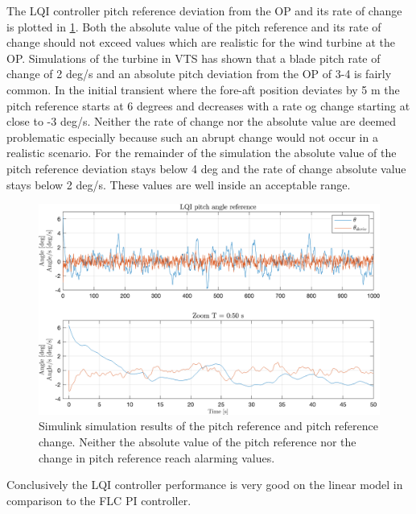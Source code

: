 The LQI controller pitch reference deviation from the OP and its rate of change is plotted in \cref{fig:app_sim_10_pitch}. Both the absolute value of the pitch reference and its rate of change should not exceed values which are realistic for the wind turbine at the OP. Simulations of the turbine in VTS has shown that a blade pitch rate of change of 2 deg/s and an absolute pitch deviation from the OP of 3-4 is fairly common. In the initial transient where the fore-aft position deviates by 5 m the pitch reference starts at 6 degrees and decreases with a rate og change starting at close to -3 deg/s. Neither the rate of change nor the absolute value are deemed problematic especially because such an abrupt change would not occur in a realistic scenario. For the remainder of the simulation the absolute value of the pitch reference deviation stays below 4 deg and the rate of change absolute value stays below 2 deg/s. These values are well inside an acceptable range.
\begin{figure}[ht]
	\centering
	\includegraphics[width=0.7\linewidth]{Graphics/TestResults/linearModPerf/sim_10_pitch.png}
	\caption{Simulink simulation results of the pitch reference and pitch reference change. Neither the absolute value of the pitch reference nor the change in pitch reference reach alarming values.}
	\label{fig:app_sim_10_pitch}
\end{figure}

Conclusively the LQI controller performance is very good on the linear model in comparison to the FLC PI controller.%


%
%

